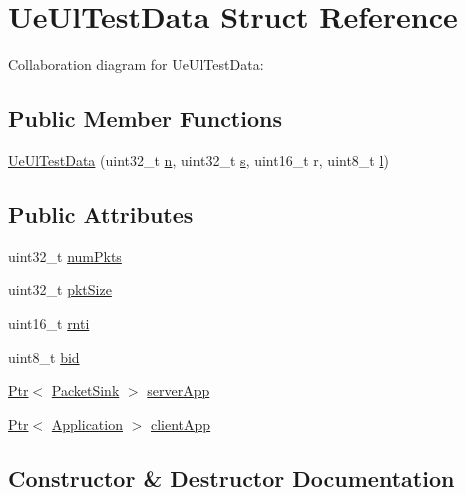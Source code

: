 \hypertarget{structUeUlTestData}{}\section{Ue\+Ul\+Test\+Data Struct Reference}
\label{structUeUlTestData}


Collaboration diagram for Ue\+Ul\+Test\+Data\+:
\subsection*{Public Member Functions}
\begin{DoxyCompactItemize}
\item 
\hyperlink{structUeUlTestData_a96213cbaa8975f7365c0ef2551e95d48}{Ue\+Ul\+Test\+Data} (uint32\+\_\+t \hyperlink{lte__link__budget__x2__handover__measures_8m_abdb05bc5a064cf642a06c83b3392f148}{n}, uint32\+\_\+t \hyperlink{generate__test__data__lte__sinr_8m_ad83eeb3a142285d1243a08c6b7026df8}{s}, uint16\+\_\+t r, uint8\+\_\+t \hyperlink{lte__pathloss_8m_a5b54c0a045f179bcbbbc9abcb8b5cd4c}{l})
\end{DoxyCompactItemize}
\subsection*{Public Attributes}
\begin{DoxyCompactItemize}
\item 
uint32\+\_\+t \hyperlink{structUeUlTestData_a44011418eb9db19dba6d443d865fbc20}{num\+Pkts}
\item 
uint32\+\_\+t \hyperlink{structUeUlTestData_a6d8b90a611f50a25aabfa94c21ab2b2a}{pkt\+Size}
\item 
uint16\+\_\+t \hyperlink{structUeUlTestData_a666e0a1106040b243821e9a4368aae26}{rnti}
\item 
uint8\+\_\+t \hyperlink{structUeUlTestData_a9f494473b9afb0adb45e4de8db91c6bc}{bid}
\item 
\hyperlink{classns3_1_1Ptr}{Ptr}$<$ \hyperlink{classns3_1_1PacketSink}{Packet\+Sink} $>$ \hyperlink{structUeUlTestData_a8debbb4e9dfd2b4be4aa2c48fb54852d}{server\+App}
\item 
\hyperlink{classns3_1_1Ptr}{Ptr}$<$ \hyperlink{classns3_1_1Application}{Application} $>$ \hyperlink{structUeUlTestData_ac5d966c7982d04f3cbe74a7b5259a15d}{client\+App}
\end{DoxyCompactItemize}


\subsection{Constructor \& Destructor Documentation}
